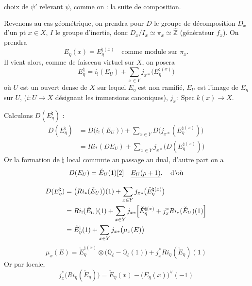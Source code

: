 \documentclass[11pt,a4paper]{article}
\begin{document}
choix de $\psi'$ relevant $\psi$, comme on  \ill{} :
\ill{} \ill{} la suite de composition.

Revenons au cas géométrique, on prendra pour $D$ le groupe de
décomposition $D_x$ d'un pt $x \in X$, $I$ le groupe d'inertie, donc
$D_x/I_x \simeq \pi_x \simeq \hat{\mathbb{Z}}$ (générateur $f_x$). On
prendra
\[
  E_\eta(x) = E_\eta^{\natural(x)} \quad \text{comme module sur } \pi_x .
\]
 Il vient alors, comme \ill{} de \ill{} faisceau virtuel
sur $X$, on posera
\[
  E_\eta^{\natural} = i_{!}(E_U) + \sum_{x \in Y} j_{x*}\bigl(E_\eta^{\natural(x)}\bigr)
\]
où $U$ est un ouvert dense de $X$ sur lequel $E_\eta$ est non ramifié,
$E_U$ est l'image de $E_\eta$ sur $U$, ($i : U \to X$ 
 désignant les immersions canoniques),
$j_x : \operatorname{Spec} k(x) \to X$.

Calculons  $D(E_\eta^{\natural})$ :
\[
  \begin{aligned}
    D(E_\eta^{\natural}) &= D\bigl(i_{!}(E_U)\bigr)
      + \sum_{x \in Y} D\bigl(j_{x*}(E_\eta^{\natural(x)})\bigr) \\
    &= R i_{*}(D E_U) + \sum_{x \in Y} j_{x*}\bigl(D(E_\eta^{\natural(x)})\bigr)
  \end{aligned}
\]
Or la formation de $\natural$ local commute au passage au dual, d'autre
part on a
\[
  D(E_U) = \check E_U(1)[2] \quad \struck{E_U(\rho+1)} , \quad \text{d'où}
\]
\[
  \begin{aligned}
    D(E_\eta^{\natural}) &= \bigl(R i_{*}(\check E_U)\bigr)(1)
      + \sum_{x \in Y} j_{x*}\bigl(\check E_\eta^{\natural(x)}\bigr) \\
    &= R i_{!}(\check E_U)(1) + \sum_{x \in Y} j_{x*}\Bigl[\check E_\eta^{\natural(x)}
      + j_x^{*} R i_{*}(\check E_U)(1)\Bigr] \\
    &= \check E_\eta^{\natural}(1) + \sum_{x \in Y} j_{x*}\bigl(\mu_x(E)\bigr)
  \end{aligned}
\]
\[
  \mu_x(E) = \check E_\eta^{\natural(x)} \otimes \bigl(\mathbb{Q}_\ell - \mathbb{Q}_\ell(1)\bigr)
    + j_x^{*} R i_{\eta}(\check E_\eta)(1)
\]
\struck{\ill{}} Or par  locale, \struck{\ill{}}
\[
  j_x^{*}\bigl(R i_{\eta}(\check E_\eta)\bigr) = \check E_\eta(x) - \bigl(E_\eta(x)\bigr)^{\vee}(-1)
\]
\end{document}

